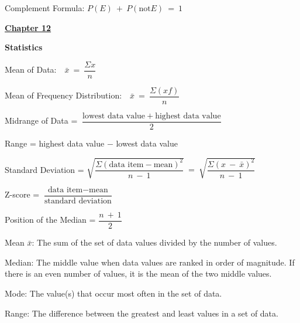 \documentclass{article}
\begin{document}
\begin{large}
\hspace{0.1in} Complement Formula: $P(E)\ +\ P(\text{not} E)\ =\ 1$

\vspace{0.25in}

\underline{\textbf{\huge Chapter 12 \phantom{ } \phantom{ } \phantom{ } \phantom{ }}}

\textbf{Statistics}

\hspace{0.1in} Mean of Data:\ \ $\bar{x}\ =\ \dfrac{\Sigma x}{n}$

\hspace{0.1in} Mean of Frequency Distribution:\ \ $\bar{x}\ =\ \dfrac{\Sigma (xf)}{n}$

\hspace{0.1in} Midrange of Data = $\dfrac{\text{lowest data value}\ +\ \text{highest data value}}{2}$

\hspace{0.1in} Range = highest data value $-$ lowest data value

\hspace{0.1in} Standard Deviation = $\sqrt{\dfrac{\Sigma (\text{data item} - \text{mean})^{2}}{n\ -\ 1}}\ =\ \sqrt{\dfrac{\Sigma (x\ -\ \bar{x})^{2}}{n\ -\ 1}}$

\hspace{0.1in} Z-score = $\dfrac{\text{data item} - \text{mean}}{\text{standard deviation}}$

\hspace{0.1in} Position of the Median = $\dfrac{n\ +\ 1}{2}$

\hspace{0.1in} Mean $\bar{x}$:\hspace{0.2in} The sum of the set of data values divided by the number of values.

\hspace{0.1in} Median:\hspace{0.2in} The middle value when data values are ranked in order of magnitude.  If there is an even number of values, it is the mean of the two middle values.

\hspace{0.1in} Mode:\hspace{0.2in} The value(s) that occur most often in the set of data.

\hspace{0.1in} Range:\hspace{0.2in} The difference between the greatest and least values in a set of data.


\end{large}
\end{document}
